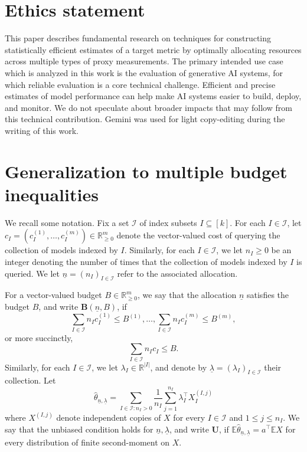 \documentclass{article} %
\newcommand{\R}{\mathbb{R}}
\newcommand{\Ex}{\mathbb{E}}
\begin{document}



\clearpage
\appendix
{} %
\localtableofcontents
\clearpage

\section{Ethics statement}
\label{sec:impacts}
This paper describes fundamental research on techniques for constructing statistically efficient estimates of a target metric by optimally allocating resources across multiple types of proxy measurements. The primary intended use case which is analyzed in this work is the evaluation of generative AI systems, for which reliable evaluation is a core technical challenge. Efficient and precise estimates of model performance  can help make AI systems easier to build, deploy, and monitor. We do not speculate about broader impacts that may follow from this technical contribution. Gemini was used for light copy-editing during the writing of this work.  

%




\section{Generalization to multiple budget inequalities}\label{app:generalized}
We recall some notation. Fix a set $\mathcal{I}$ of index subsets $I\subseteq[k]$. For each $I\in\mathcal{I}$, let $c_I=(c_I^{(1)},\dots,c_I^{(m)})\in\R_{\geq0}^m$ denote the vector-valued cost of querying the collection of models indexed by $I$. Similarly, for each $I\in\mathcal{I}$, we let $n_I\geq0$ be an integer denoting the number of times that the collection of models indexed by $I$ is queried. We let $\underline{n}=(n_I)_{I\in\mathcal{I}}$ refer to the associated allocation.

For a vector-valued budget $B\in\R_{\geq0}^m$, we say that the allocation $\underline{n}$ satisfies the budget $B$, and write $\mathbf{B}(\underline{n},B)$, if
\[
\sum_{I\in\mathcal{I}} n_Ic_I^{(1)}\leq B^{(1)},\dots,\sum_{I\in\mathcal{I}}n_Ic_I^{(m)}\leq B^{(m)},
\]
or more succinctly, 
\[
\sum_{I\in\mathcal{I}}n_Ic_I\leq B.
\]
Similarly, for each $I\in\mathcal{I}$, we let $\lambda_I\in\R^{|I|}$, and denote by $\underline{\lambda}=(\lambda_I)_{I\in\mathcal{I}}$ their collection. Let
\[
\hat{\theta}_{\underline{n},\underline{\lambda}} = \sum_{I\in\mathcal{I}:n_I>0}\frac{1}{n_I}\sum_{j=1}^{n_I}\lambda_I^\top X_I^{(I,j)}
\]
where $X^{(I,j)}$ denote independent copies of $X$ for every $I\in\mathcal{I}$ and $1\leq j\leq n_I$. We say that the unbiased condition holds for $\underline{n},\underline{\lambda}$, and write $\mathbf{U}$, if $\Ex \hat{\theta}_{\underline{n},\underline{\lambda}}=a^\top\Ex X$ for every distribution of finite second-moment on $X$.
\end{document}
